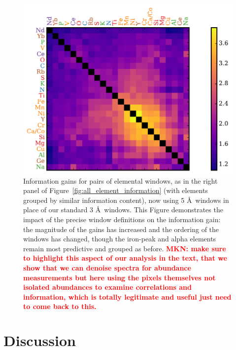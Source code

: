 \documentclass[a4paper,fleqn,usenatbib]{mnras}
\newcommand{\mkn}[1]{\textbf{\textcolor{red}{MKN: #1}}}
\begin{document}
\begin{figure}
	\includegraphics[width=\columnwidth]{apogee_centers_final_29502_spc_sorted_inf_gains_abs_min_tot_dist.pdf}
    \caption{Information gains for pairs of elemental windows, as in the right panel of  Figure~\ref{fig:all_element_information} (with elements grouped by similar information content), now using 5 \AA\ windows in place of our standard 3 \AA\ windows. This Figure demonstrates the impact of the precise window definitions on the information gain: the magnitude of the gains has increased and the ordering of the windows has changed, though the iron-peak and alpha elements remain most predictive and grouped as before. \mkn{make sure to highlight this aspect of our analysis in the text, that we show that we can denoise spectra for abundance measurements but here using the pixels themselves not isolated abundances to examine correlations and information, which is totally legitimate and useful just need to come back to this. }}
    \label{fig:all_element_information_wide}
\end{figure}




\section{Discussion}
\end{document}
